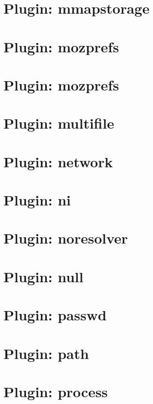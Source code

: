 \let\mypdfximage\pdfximage\def\pdfximage{\immediate\mypdfximage}\documentclass[twoside]{book}
\newcommand{\+}{\discretionary{\mbox{\scriptsize$\hookleftarrow$}}{}{}}
\begin{document}
\chapter{Plugin\+: mmapstorage}
\label{autotoc_md442}

\chapter{Plugin\+: mozprefs}
\label{autotoc_md464}

\chapter{Plugin\+: mozprefs}
\label{autotoc_md472}

\chapter{Plugin\+: multifile}
\label{autotoc_md479}

\chapter{Plugin\+: network}
\label{autotoc_md484}

\chapter{Plugin\+: ni}
\label{autotoc_md500}

\chapter{Plugin\+: noresolver}
\label{autotoc_md510}

\chapter{Plugin\+: null}
\label{autotoc_md511}

\chapter{Plugin\+: passwd}
\label{autotoc_md514}

\chapter{Plugin\+: path}
\label{autotoc_md520}

\chapter{Plugin\+: process}
\label{autotoc_md529}

\end{document}

